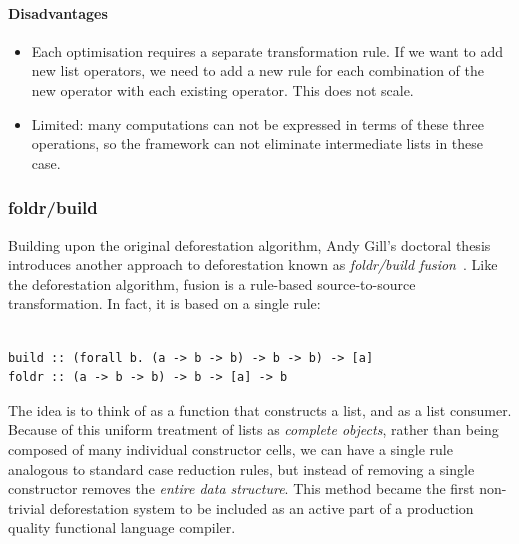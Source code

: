 \paragraph{Disadvantages}
\begin{itemize}
    \item Each optimisation requires a separate transformation rule. If we want
        to add new list operators, we need to add a new rule for each
        combination of the new operator with each existing operator. This does
        not scale.

    \item Limited: many computations can not be expressed in terms of these
        three operations, so the framework can not eliminate intermediate lists
        in these case.
\end{itemize}


\subsubsection{foldr/build}

Building upon the original deforestation algorithm, Andy Gill's doctoral thesis
introduces another approach to deforestation known as \emph{foldr/build
fusion}~\cite{Gill:1996tf,Gill:1993de}.
Like the deforestation algorithm,  fusion is a rule-based
source-to-source transformation. In fact, it is based on a single rule:
%
\begin{lstlisting}[style=Haskell,numbers=none,mathescape,caption={The \code{foldr/build} transformation}]
%\bf$\langle$ foldr/build fusion $\rangle$% forall g k z. foldr k z (build g) $\mapsto$ g k z

build :: (forall b. (a -> b -> b) -> b -> b) -> [a]
foldr :: (a -> b -> b) -> b -> [a] -> b
\end{lstlisting}

The idea is to think of  as a function that constructs a list, and
 as a list consumer. Because of this uniform treatment of lists as
\emph{complete objects}, rather than being composed of many individual
constructor cells, we can have a single  rule analogous to
standard case reduction rules, but instead of removing a single constructor
removes the \emph{entire data structure}. This method became the first
non-trivial deforestation system to be included as an active part of a
production quality functional language compiler.


